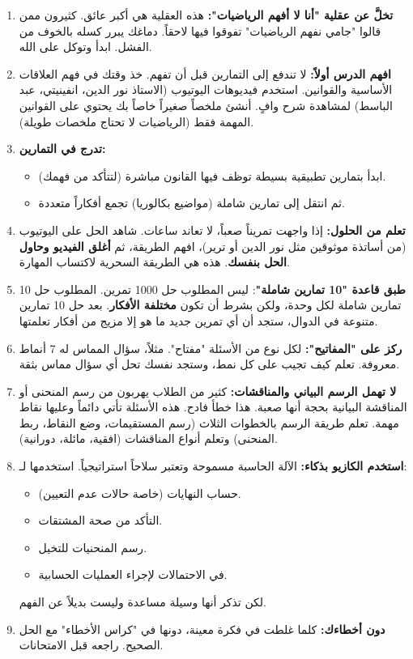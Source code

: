 \documentclass[12pt,a4paper]{book}
\begin{document}
	\begin{enumerate}
		\item \textbf{تخلَّ عن عقلية "أنا لا أفهم الرياضيات":} هذه العقلية هي أكبر عائق. كثيرون ممن قالوا "جامي نفهم الرياضيات" تفوقوا فيها لاحقاً. دماغك يبرر كسله بالخوف من الفشل. ابدأ وتوكل على الله.
		\item \textbf{افهم الدرس أولاً:} لا تندفع إلى التمارين قبل أن تفهم. خذ وقتك في فهم العلاقات الأساسية والقوانين. استخدم فيديوهات اليوتيوب (الاستاذ نور الدين، انفينيتي، عبد الباسط) لمشاهدة شرح وافٍ. أنشئ ملخصاً صغيراً خاصاً بك يحتوي على القوانين المهمة فقط (الرياضيات لا تحتاج ملخصات طويلة).
		\item \textbf{تدرج في التمارين:}
		\begin{itemize}
			\item ابدأ بتمارين تطبيقية بسيطة توظف فيها القانون مباشرة (لتتأكد من فهمك).
			\item ثم انتقل إلى تمارين شاملة (مواضيع بكالوريا) تجمع أفكاراً متعددة.
		\end{itemize}
		\item \textbf{تعلم من الحلول:} إذا واجهت تمريناً صعباً، لا تعاند ساعات. شاهد الحل على اليوتيوب (من أساتذة موثوقين مثل نور الدين أو ترير)، افهم الطريقة، ثم \textbf{أغلق الفيديو وحاول الحل بنفسك}. هذه هي الطريقة السحرية لاكتساب المهارة.
		\item \textbf{طبق قاعدة "10 تمارين شاملة"}: ليس المطلوب حل 1000 تمرين. المطلوب حل 10 تمارين شاملة لكل وحدة، ولكن بشرط أن تكون \textbf{مختلفة الأفكار}. بعد حل 10 تمارين متنوعة في الدوال، ستجد أن أي تمرين جديد ما هو إلا مزيج من أفكار تعلمتها.
		\item \textbf{ركز على "المفاتيح":} لكل نوع من الأسئلة "مفتاح". مثلاً، سؤال المماس له 7 أنماط معروفة. تعلم كيف تجيب على كل نمط، وستجد نفسك تحل أي سؤال مماس بثقة.
		\item \textbf{لا تهمل الرسم البياني والمناقشات:} كثير من الطلاب يهربون من رسم المنحنى أو المناقشة البيانية بحجة أنها صعبة. هذا خطأ فادح. هذه الأسئلة تأتي دائماً وعليها نقاط مهمة. تعلم طريقة الرسم بالخطوات الثلاث (رسم المستقيمات، وضع النقاط، ربط المنحنى) وتعلم أنواع المناقشات (افقية، مائلة، دورانية).
		\item \textbf{استخدم الكازيو بذكاء:} الآلة الحاسبة مسموحة وتعتبر سلاحاً استراتيجياً. استخدمها لـ:
		\begin{itemize}
			\item حساب النهايات (خاصة حالات عدم التعيين).
			\item التأكد من صحة المشتقات.
			\item رسم المنحنيات للتخيل.
			\item في الاحتمالات لإجراء العمليات الحسابية.
		\end{itemize}
		لكن تذكر أنها وسيلة مساعدة وليست بديلاً عن الفهم.
		\item \textbf{دون أخطاءك:} كلما غلطت في فكرة معينة، دونها في "كراس الأخطاء" مع الحل الصحيح. راجعه قبل الامتحانات.
	\end{enumerate}
	
\end{document}
